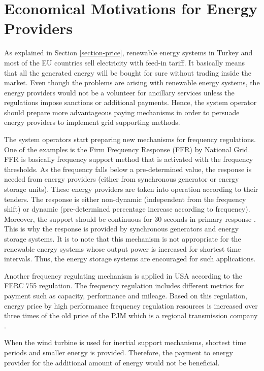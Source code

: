 \section{Economical Motivations for Energy Providers}
As explained in Section \ref{section-price}, renewable energy systems in Turkey and most of the EU countries sell electricity with feed-in tariff. It basically means that all the generated energy will be bought for sure without trading inside the market. Even though the problems are arising with renewable energy systems, the energy providers would not be a volunteer for ancillary services unless the regulations impose sanctions or additional payments. Hence, the system operator should prepare more advantageous paying mechanisms in order to persuade energy providers to implement grid supporting methods. \par
The system operators start preparing new mechanisms for frequency regulations. One of the examples is the Firm Frequency Response (FFR) by National Grid. FFR is basically frequency support method that is activated with the frequency thresholds. As the frequency falls below a pre-determined value, the response is needed from energy providers (either from synchronous generator or energy storage units). These energy providers are taken into operation according to their tenders. The response is either non-dynamic (independent from the frequency shift) or dynamic (pre-determined percentage increase according to frequency). Moreover, the  support should be continuous for 30 seconds in primary response \cite{Smethurst2017}. This is why the response is provided by synchronous generators and energy storage systems. It is to note that this mechanism is not appropriate for the renewable energy systems whose output power is increased for shortest time intervals. Thus, the energy storage systems are encouraged for such applications. \par
Another frequency regulating mechanism is applied in USA according to the FERC 755 regulation. The frequency regulation includes different metrics for payment such as capacity, performance and mileage. Based on this regulation, energy price by high performance frequency regulation resources is increased over three times of the old price of the PJM which is a regional transmission company \cite{NECEnergySolutions2014}.\par
When the wind turbine is used for inertial support mechanisms, shortest time periods and smaller energy is provided. Therefore, the payment to energy provider for the additional amount of energy would not be beneficial.


